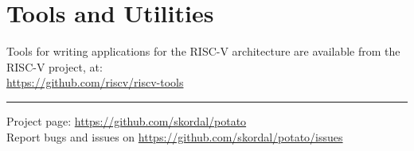 \documentclass[10pt,a4paper]{article}
\begin{document}
\begin{minipage}[t]{0.48\textwidth}
\section{Tools and Utilities}

Tools for writing applications for the RISC-V architecture are available from the
RISC-V project, at:\\[1em]
\url{https://github.com/riscv/riscv-tools}\\

\end{minipage}

\vfill
\noindent\rule{\linewidth}{1pt}
{\small
Project page: \url{https://github.com/skordal/potato}\\
Report bugs and issues on \url{https://github.com/skordal/potato/issues}}
\end{document}
